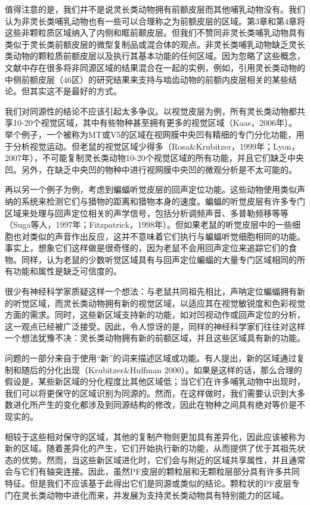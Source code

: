 值得注意的是，我们并不是说灵长类动物拥有前额皮层而其他哺乳动物没有。我们认为非灵长类哺乳动物也有一些可以合理称之为前额皮层的区域。第3章和第4章将这些非颗粒质区域纳入了内侧和眶前颞皮层。但我们不赞同非灵长类哺乳动物具有类似于灵长类前额皮层的微型复制品或混合体的观点。非灵长类哺乳动物缺乏灵长类动物的颗粒质前额皮层以及执行其基本功能的任何区域。因为忽略了这些概念，文献中存在很多将非同源区域的结果混合在一起的实例，例如，引用灵长类动物的中侧前额皮层（46区）的研究结果来支持与啮齿动物的前额内皮层相关的某些结论。但其实这不是最好的方式。

我们对同源性的结论不应该引起太多争议。以视觉皮层为例，所有灵长类动物都共享10-20个视觉区域，其中有些物种甚至拥有更多的视觉区域（Kaas，2006年）。举个例子，一个被称为MT或V5的区域在视网膜中央凹有精细的专门分化功能，用于分析视觉运动。但老鼠的视觉区域少得多（Rosa\&Krubitzer，1999年；Lyon，2007年），不可能复制灵长类动物10-20个视觉区域的所有功能，并且它们缺乏中央凹。另外，在缺乏中央凹的物种中进行视网膜中央凹的微观分析是不太可能的。

再以另一个例子为例，考虑到蝙蝠听觉皮层的回声定位功能。这些动物使用类似声纳的系统来检测它们与猎物的距离和猎物本身的速度。蝙蝠的听觉皮层有许多专门区域来处理与回声定位相关的声学信号，包括分析调频声音、多普勒频移等等（Suga等人，1997年；Fitzpatrick，1998年）。但如果老鼠的听觉皮层中的一些细胞也对类似的声音作出反应，这并不意味着它们执行与蝙蝠听觉细胞相同的功能。事实上，想象它们这样做是很奇怪的，因为老鼠不会用回声定位来追踪它们的食物。同样，认为老鼠的少数听觉区域具有与回声定位蝙蝠的大量专门区域相同的所有功能和属性是缺乏可信度的。

很少有神经科学家质疑这样一个想法：与老鼠共同祖先相比，声呐定位蝙蝠拥有新的听觉区域，而灵长类动物拥有新的视觉区域，以适应其在视觉敏锐度和色彩视觉方面的需求。同时，这些新区域支持新的功能，如对凹视动作或回声定位的分析，这一观点已经被广泛接受。因此，令人惊讶的是，同样的神经科学家们往往对这样一个想法犹豫不决：灵长类动物拥有新的前额区域，并且这些区域具有新的功能。

问题的一部分来自于使用“新”的词来描述区域或功能。有人提出，新的区域通过复制和随后的分化出现（Krubitzer\&Huffman 2000）。如果是这样的话，那么合理的假设是，某些新区域的分化程度比其他区域低；当它们在许多哺乳动物中出现时，我们可以将更保守的区域识别为同源的。然而，在这样做时，我们需要认识到大多数进化所产生的变化都涉及到同源结构的修改，因此在物种之间具有绝对等价是不现实的。

相较于这些相对保守的区域，其他的复制产物则更加具有差异化，因此应该被称为新的区域。随着差异化的产生，它们开始执行新的功能，从而提供了优于其祖先状态的优势。然而，当这些新区域进化时，它们会与附近的区域共享属性，并且通常会与它们有轴突连接。因此，虽然PF皮层的颗粒层和无颗粒层部分具有许多共同特征。但是我们不应该基于此得出它们是同源或类似的结论。颗粒状的PF皮层专门在灵长类动物中进化而来，并发展为支持灵长类动物具有特别能力的区域。


